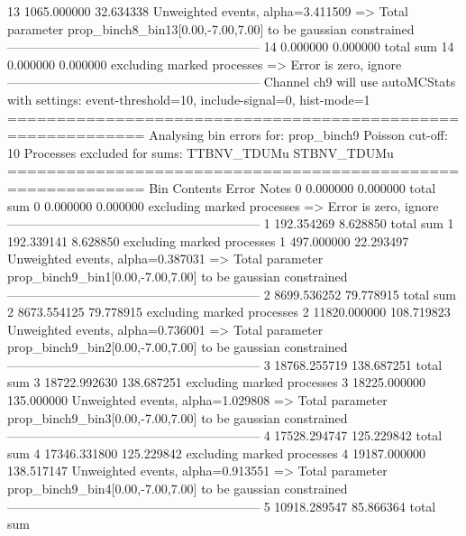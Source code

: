 13         1065.000000     32.634338       Unweighted events, alpha=3.411509
  => Total parameter prop_binch8_bin13[0.00,-7.00,7.00] to be gaussian constrained
------------------------------------------------------------
14         0.000000        0.000000        total sum                     
14         0.000000        0.000000        excluding marked processes    
  => Error is zero, ignore      
------------------------------------------------------------
Channel ch9 will use autoMCStats with settings: event-threshold=10, include-signal=0, hist-mode=1
============================================================
Analysing bin errors for: prop_binch9
Poisson cut-off: 10
Processes excluded for sums: TTBNV_TDUMu STBNV_TDUMu
============================================================
Bin        Contents        Error           Notes                         
0          0.000000        0.000000        total sum                     
0          0.000000        0.000000        excluding marked processes    
  => Error is zero, ignore      
------------------------------------------------------------
1          192.354269      8.628850        total sum                     
1          192.339141      8.628850        excluding marked processes    
1          497.000000      22.293497       Unweighted events, alpha=0.387031
  => Total parameter prop_binch9_bin1[0.00,-7.00,7.00] to be gaussian constrained
------------------------------------------------------------
2          8699.536252     79.778915       total sum                     
2          8673.554125     79.778915       excluding marked processes    
2          11820.000000    108.719823      Unweighted events, alpha=0.736001
  => Total parameter prop_binch9_bin2[0.00,-7.00,7.00] to be gaussian constrained
------------------------------------------------------------
3          18768.255719    138.687251      total sum                     
3          18722.992630    138.687251      excluding marked processes    
3          18225.000000    135.000000      Unweighted events, alpha=1.029808
  => Total parameter prop_binch9_bin3[0.00,-7.00,7.00] to be gaussian constrained
------------------------------------------------------------
4          17528.294747    125.229842      total sum                     
4          17346.331800    125.229842      excluding marked processes    
4          19187.000000    138.517147      Unweighted events, alpha=0.913551
  => Total parameter prop_binch9_bin4[0.00,-7.00,7.00] to be gaussian constrained
------------------------------------------------------------
5          10918.289547    85.866364       total sum                     
